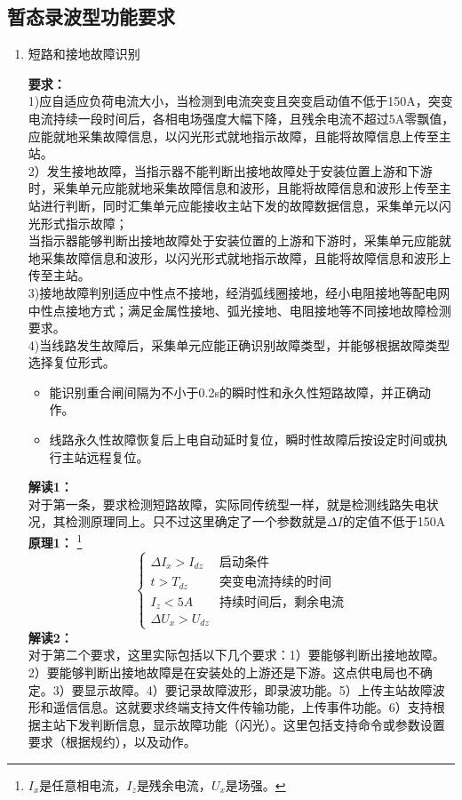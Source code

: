 \documentclass{article}
\begin{document}
\begin{CJK}{UTF8}{gbsn}
\section{暂态录波型功能要求}
\begin{enumerate}
\item 短路和接地故障识别
	\par
	\textbf{要求：}\\
	1)应自适应负荷电流大小，当检测到电流突变且突变启动值不低于150A，突变电流持续一段时间后，各相电场强度大幅下降，且残余电流不超过5A零飘值，应能就地采集故障信息，以闪光形式就地指示故障，且能将故障信息上传至主站。\\
	2）发生接地故障，当指示器不能判断出接地故障处于安装位置上游和下游时，采集单元应能就地采集故障信息和波形，且能将故障信息和波形上传至主站进行判断，同时汇集单元应能接收主站下发的故障数据信息，采集单元以闪光形式指示故障；\\
	当指示器能够判断出接地故障处于安装位置的上游和下游时，采集单元应能就地采集故障信息和波形，以闪光形式就地指示故障，且能将故障信息和波形上传至主站。\\
	3)接地故障判别适应中性点不接地，经消弧线圈接地，经小电阻接地等配电网中性点接地方式；满足金属性接地、弧光接地、电阻接地等不同接地故障检测要求。\\
	4)当线路发生故障后，采集单元应能正确识别故障类型，并能够根据故障类型选择复位形式。
	\begin{itemize}
			\item 能识别重合闸间隔为不小于0.2s的瞬时性和永久性短路故障，并正确动作。
			\item 线路永久性故障恢复后上电自动延时复位，瞬时性故障后按设定时间或执行主站远程复位。
	\end{itemize}
	\textbf{解读1：}\\
	对于第一条，要求检测短路故障，实际同传统型一样，就是检测线路失电状况，其检测原理同上。只不过这里确定了一个参数就是$\Delta I$的定值不低于150A\\
	\textbf{原理1：}
	\footnote{$I_x$是任意相电流，$I_z$是残余电流，$U_x$是场强。}
	$$	
		\left\{ \begin{array}{ll}
				\Delta I_x>I_{dz} & \textrm{启动条件}\\
			    t>T_{dz} & \textrm{突变电流持续的时间}\\
				I_z<5A & \textrm{持续时间后，剩余电流}\\ 
			\Delta U_x>U_{dz}
		\end{array}
		\right.
	$$
	\textbf{解读2：}\\
	对于第二个要求，这里实际包括以下几个要求：1）要能够判断出接地故障。2）要能够判断出接地故障是在安装处的上游还是下游。这点供电局也不确定。3）要显示故障。4）要记录故障波形，即录波功能。5）上传主站故障波形和遥信信息。这就要求终端支持文件传输功能，上传事件功能。6）支持根据主站下发判断信息，显示故障功能（闪光）。这里包括支持命令或参数设置要求（根据规约），以及动作。\\

\end{enumerate}
\end{CJK}
\end{document}
